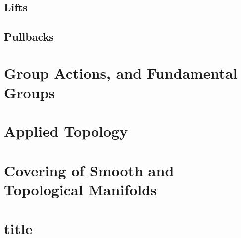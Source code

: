 \documentclass[Total.tex]{subfiles}
\begin{document}
			\subsection{Lifts}
			\subsection{Pullbacks}
		\section{Group Actions, and Fundamental Groups}
		\section{Applied Topology}
		\section{Covering of Smooth and Topological Manifolds}
		\section{title}
\end{document}
